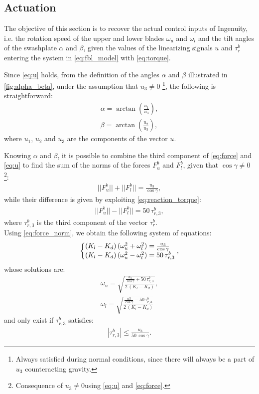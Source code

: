\subsection{Actuation} \label{sec:fbl_actuation}
The objective of this section is to recover the actual control inputs of Ingenuity, i.e. the rotation speed of the upper and lower blades $\omega_u$ and $\omega_l$ and the tilt angles of the swashplate $\alpha$ and $\beta$, given the values of the linearizing signals $u$ and $\tau_{r}^b$ entering the system in \ref{eq:fbl_model} with \ref{eq:torque}.

Since \ref{eq:u} holds, from the definition of the angles $\alpha$ and $\beta$ illustrated in \ref{fig:alpha_beta}, under the assumption that $u_3 \neq 0$ \footnote{Always satisfied during normal conditions, since there will always be a part of $u_3$ counteracting gravity.}, the following is straightforward:
\begin{gather*}
    \alpha = \arctan\left(\frac{u_1}{u_3}\right), \\
    \beta = \arctan\left(\frac{u_2}{u_3}\right),
\end{gather*}
where $u_1$, $u_2$ and $u_3$ are the components of the vector $u$.

Knowing $\alpha$ and $\beta$, it is possible to combine the third component of \ref{eq:force} and \ref{eq:u} to find the sum of the norms of the forces $F_u^b$ and $F_l^b$, given that $\cos{\gamma} \neq 0$\footnote{Consequence of $u_3 \neq 0$\footnotemark[1] using \ref{eq:u} and \ref{eq:force}.}:
\begin{align*}
    ||F_u^b|| + ||F_l^b|| = \frac{u_3}{\cos{\gamma}},
\end{align*}
while their difference is given by exploiting \ref{eq:reaction_torque}:
\begin{align*}
    ||F_u^b|| - ||F_l^b|| = 50 \, \tau^b_{r,3},
\end{align*}
where $\tau^b_{r,3}$ is the third component of the vector $\tau^b_r$.\\
Using \ref{eq:force_norm}, we obtain the following system of equations:
\begin{equation*}
    \left\{\begin{array}{@{}l@{}}
        (K_l - K_d) \, (\omega_u^2 + \omega_l^2)= \frac{u_3}{\cos{\gamma}} \\
        (K_l - K_d) \, (\omega_u^2 - \omega_l^2) = 50 \, \tau^b_{r,3} \\
    \end{array}\right. ,
\end{equation*}
whose solutions are:
\begin{gather*}
    \omega_u = \sqrt{\frac{\frac{u_3}{\cos{\gamma}} + 50 \, \tau^b_{r, 3}}{2 \, (K_l - K_d)}}, \\
    \omega_l = \sqrt{\frac{\frac{u3}{\cos{\gamma}} - 50 \, \tau^b_{r, 3}}{2 \, (K_l - K_d)}}
\end{gather*}
and only exist if $\tau^b_{r, 3}$ satisfies:
\begin{align*}
    |\tau^b_{r, 3}| \leq \frac{u_3}{50 \, \cos{\gamma}}.
\end{align*}